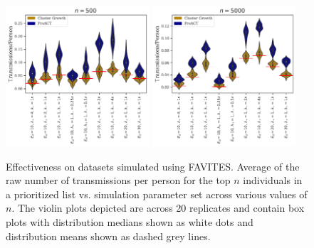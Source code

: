 \documentclass[a4paper,11pt]{article}
\begin{document}
\begin{figure}[!h]
\includegraphics[width=0.475\textwidth]{figs/results_efficacy_individual_n500.pdf}
\includegraphics[width=0.475\textwidth]{figs/results_efficacy_individual_n5000.pdf}\\
\caption{{Effectiveness on datasets simulated using FAVITES. Average of the raw number of transmissions per person for the top $n$ individuals in a prioritized list vs. simulation parameter set across various values of $n$. The violin plots depicted are across 20 replicates and contain box plots with distribution medians shown as white dots and distribution means shown as dashed grey lines.}}\label{fig:efficacy-vs-n}
\end{figure}

\clearpage
\end{document}
